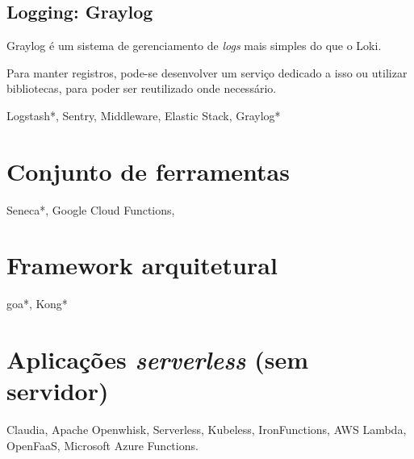 \subsection{Logging: Graylog}
Graylog é um sistema de gerenciamento de \emph{logs} mais simples do que o Loki.

Para manter registros, pode-se desenvolver um serviço dedicado a isso ou utilizar bibliotecas, para poder ser reutilizado onde necessário.

Logstash*, Sentry, Middleware, Elastic Stack, Graylog*

\section{Conjunto de ferramentas}
Seneca*, Google Cloud Functions,

\section{Framework arquitetural}
goa*, Kong*

\section{Aplicações \emph{serverless} (sem servidor)}
Claudia, Apache Openwhisk, Serverless, Kubeless, IronFunctions, AWS Lambda, OpenFaaS, Microsoft Azure Functions.

